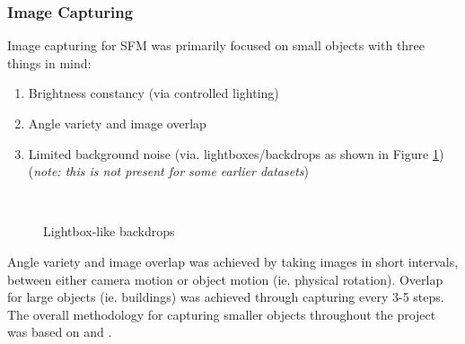 \documentclass[conference,compsoc]{IEEEtran}
\begin{document}
\subsubsection{Image Capturing}
Image capturing for SFM was primarily focused on small objects with 
three things in mind:
\begin{enumerate}[1.]
    \item Brightness constancy (via controlled lighting)
    \item Angle variety and image overlap
    \item Limited background noise (via. lightboxes/backdrops as shown in Figure \ref{fig:backdrops})
    (\textit{note: this is not present for some earlier datasets})
\end{enumerate}
\begin{figure}[ht!]
    \
    \caption{Lightbox-like backdrops}
    \label{fig:backdrops}
\end{figure}
Angle variety and image overlap was achieved by taking images in short intervals,
between either camera motion or object motion (ie. physical rotation). Overlap for 
large objects (ie. buildings) was achieved through capturing every 3-5 steps. 
\\
The overall methodology for capturing smaller objects throughout the project was 
based on \cite{temple} and \cite{viking}.
\end{document}
